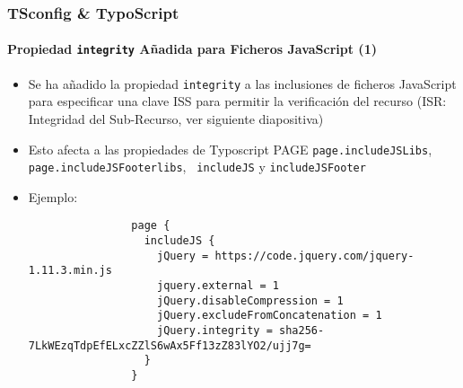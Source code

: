 \begin{frame}[fragile]
	\frametitle{TSconfig \& TypoScript}
	\framesubtitle{Propiedad \texttt{integrity} Añadida para Ficheros JavaScript (1)}

	\lstset{basicstyle=\tiny\ttfamily}

	\begin{itemize}

		\item Se ha añadido la propiedad \texttt{integrity} a las inclusiones de ficheros JavaScript para
			especificar una clave ISS para permitir la verificación del recurso\newline
			(ISR: Integridad del Sub-Recurso, ver siguiente diapositiva)

		\item Esto afecta a las propiedades de Typoscript PAGE \texttt{page.includeJSLibs},
			\texttt{page.includeJSFooterlibs}, \texttt{ includeJS} y
			\texttt{includeJSFooter}

		\item Ejemplo:

			\begin{lstlisting}
				page {
				  includeJS {
				    jQuery = https://code.jquery.com/jquery-1.11.3.min.js
				    jquery.external = 1
				    jQuery.disableCompression = 1
				    jQuery.excludeFromConcatenation = 1
				    jQuery.integrity = sha256-7LkWEzqTdpEfELxcZZlS6wAx5Ff13zZ83lYO2/ujj7g=
				  }
				}
			\end{lstlisting}

	\end{itemize}

\end{frame}


